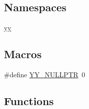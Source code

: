 \subsection*{Namespaces}
\begin{DoxyCompactItemize}
\item 
\hyperlink{namespaceyy}{yy}
\end{DoxyCompactItemize}
\subsection*{Macros}
\begin{DoxyCompactItemize}
\item 
\#define \hyperlink{position_8hh_a5a6c82f7ce4ad9cc8c6c08b7a2de5b84}{Y\-Y\-\_\-\-N\-U\-L\-L\-P\-T\-R}~0
\end{DoxyCompactItemize}
\subsection*{Functions}
